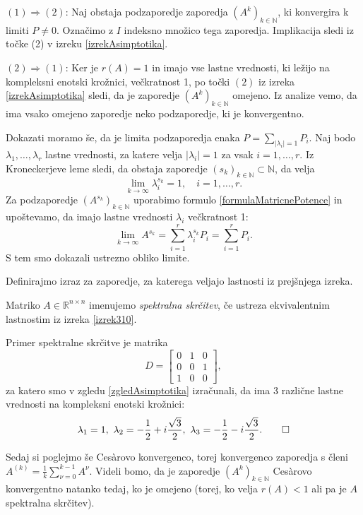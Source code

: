 \documentclass[mat1]{fmfdelo}
\newcommand{\R}{\mathbb R}
\newcommand{\N}{\mathbb N}
\begin{document}
\begin{dokaz}
    $(1) \Rightarrow (2)$: Naj obstaja podzaporedje zaporedja $(A^k)_{k\in\N}$, ki konvergira k limiti $P \neq 0$. Označimo z $I$ indeksno množico tega zaporedja. Implikacija sledi iz točke (2) v izreku \ref{izrekAsimptotika}.

    \noindent $(2) \Rightarrow (1)$: Ker je $r(A) = 1$ in imajo vse lastne vrednosti, ki ležijo na kompleksni enotski krožnici, večkratnost 1, po točki $(2)$ iz izreka \ref{izrekAsimptotika} sledi, da je zaporedje $(A^k)_{k\in\N}$ omejeno. Iz analize vemo, da ima vsako omejeno zaporedje neko podzaporedje, ki je konvergentno.

    Dokazati moramo še, da je limita podzaporedja enaka $P = \sum_{|\lambda_i| = 1} P_i$. Naj bodo $\lambda_1, \ldots, \lambda_r$ lastne vrednosti, za katere velja $|\lambda_i| = 1$ za vsak $i=1,\ldots,r$. Iz Kroneckerjeve leme sledi, da obstaja zaporedje $(s_k)_{k\in\N} \subset \N$, da velja
    \begin{equation*}
        \lim_{k \rightarrow \infty} \lambda_i^{s_k} = 1,\quad i=1,\ldots, r.
    \end{equation*}
    Za podzaporedje $(A^{s_k})_{k\in\N}$ uporabimo formulo \eqref{formulaMatricnePotence} in upoštevamo, da imajo lastne vrednosti $\lambda_i$ večkratnost 1:
    \begin{equation*}
        \lim_{k \rightarrow \infty} A^{s_k} = \sum_{i=1}^r \lambda_i^{s_k} P_i = \sum_{i=1}^r P_i.
    \end{equation*}
    S tem smo dokazali ustrezno obliko limite.
\end{dokaz}
Definirajmo izraz za zaporedje, za katerega veljajo lastnosti iz prejšnjega izreka.
\begin{definicija}
    Matriko $A \in \R^{n \times n}$ imenujemo \emph{spektralna skrčitev}, če ustreza ekvivalentnim lastnostim iz izreka \ref{izrek310}.
\end{definicija}
\begin{zgled}
    Primer spektralne skrčitve je matrika
    \begin{equation*}
        D =
        \begin{bmatrix}
            0 & 1 & 0 \\
            0 & 0 & 1 \\
            1 & 0 & 0
        \end{bmatrix},
    \end{equation*}
    za katero smo v zgledu \ref{zgledAsimptotika} izračunali, da ima $3$ različne lastne vrednosti na kompleksni enotski krožnici: \[\lambda_1=1,\ \lambda_2 = - \frac{1}{2} + i\frac{\sqrt{3}}{2},\ \lambda_3 = - \frac{1}{2} - i\frac{\sqrt{3}}{2}. \qedhere\]
\end{zgled}
Sedaj si poglejmo še Ces\`arovo konvergenco, torej konvergenco zaporedja s členi $A^{(k)} = \frac{1}{k} \sum_{\nu=0}^{k-1} A^\nu$. Videli bomo, da je zaporedje $(A^k)_{k\in\N}$ Ces\`arovo konvergentno natanko tedaj, ko je omejeno (torej, ko velja $r(A) < 1$ ali pa je $A$ spektralna skrčitev).
\end{document}
